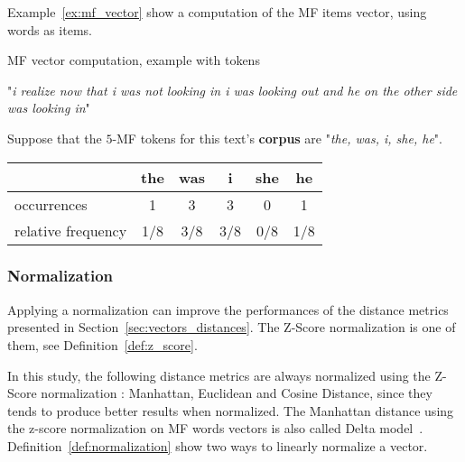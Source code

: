 Example~\ref{ex:mf_vector} show a computation of the MF items vector, using words as items.

\begin{example}
  \centering
  \caption{MF vector computation, example with tokens}
  \label{ex:mf_vector}

  \begin{subexample}{\linewidth}
    "\textit{i realize now that i was not looking in i was looking out and he on the other side was looking in}"\cite{ddlc}
  \end{subexample}

  \vspace{0.5cm}

  \begin{subexample}{\linewidth}
    Suppose that the $5$-MF tokens for this text's \textbf{corpus} are "\textit{the, was, i, she, he}".

    \vspace{0.2cm}
    \centering
    \begin{tabular}{l c c c c c}
      \toprule
                       & the & was & i   & she & he  \\
      \midrule
      occurrences         & 1   & 3   & 3   & 0   & 1   \\
      relative frequency & 1/8 & 3/8 & 3/8 & 0/8 & 1/8 \\
      \bottomrule
    \end{tabular}
  \end{subexample}
\end{example}

\subsubsection{Normalization}

Applying a normalization can improve the performances of the distance metrics presented in Section~\ref{sec:vectors_distances}.
The Z-Score normalization is one of them, see Definition~\ref{def:z_score}.

In this study, the following distance metrics are always normalized using the Z-Score normalization : Manhattan, Euclidean and Cosine Distance, since they tends to produce better results when normalized.
The Manhattan distance using the z-score normalization on MF words vectors is also called Delta model~\cite{savoy_stylo}.
Definition~\ref{def:normalization} show two ways to linearly normalize a vector.


